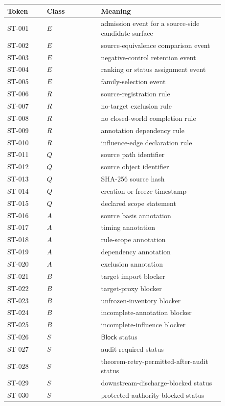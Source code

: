 \documentclass[11pt]{article}
\newcommand{\Block}{\mathsf{Block}}
\begin{document}
\begin{center}
\begin{tabular}{p{0.16\linewidth}p{0.22\linewidth}p{0.50\linewidth}}
\textbf{Token} & \textbf{Class} & \textbf{Meaning} \\
\hline
ST-001 & \(E\) & admission event for a source-side candidate surface \\
ST-002 & \(E\) & source-equivalence comparison event \\
ST-003 & \(E\) & negative-control retention event \\
ST-004 & \(E\) & ranking or status assignment event \\
ST-005 & \(E\) & family-selection event \\
ST-006 & \(R\) & source-registration rule \\
ST-007 & \(R\) & no-target exclusion rule \\
ST-008 & \(R\) & no closed-world completion rule \\
ST-009 & \(R\) & annotation dependency rule \\
ST-010 & \(R\) & influence-edge declaration rule \\
ST-011 & \(Q\) & source path identifier \\
ST-012 & \(Q\) & source object identifier \\
ST-013 & \(Q\) & SHA-256 source hash \\
ST-014 & \(Q\) & creation or freeze timestamp \\
ST-015 & \(Q\) & declared scope statement \\
ST-016 & \(A\) & source basis annotation \\
ST-017 & \(A\) & timing annotation \\
ST-018 & \(A\) & rule-scope annotation \\
ST-019 & \(A\) & dependency annotation \\
ST-020 & \(A\) & exclusion annotation \\
ST-021 & \(B\) & target import blocker \\
ST-022 & \(B\) & target-proxy blocker \\
ST-023 & \(B\) & unfrozen-inventory blocker \\
ST-024 & \(B\) & incomplete-annotation blocker \\
ST-025 & \(B\) & incomplete-influence blocker \\
ST-026 & \(S\) & \(\Block\) status \\
ST-027 & \(S\) & audit-required status \\
ST-028 & \(S\) & theorem-retry-permitted-after-audit status \\
ST-029 & \(S\) & downstream-discharge-blocked status \\
ST-030 & \(S\) & protected-authority-blocked status \\
\end{tabular}
\end{center}
\end{document}
